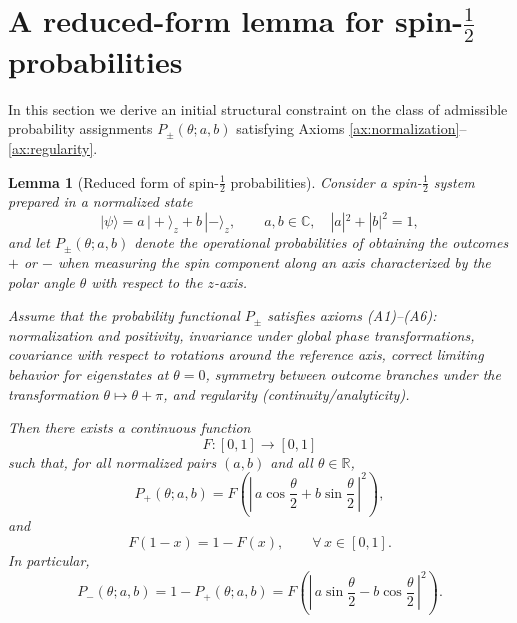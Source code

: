 \documentclass[11pt,a4paper]{article}
\numberwithin{equation}{section}
\newtheorem{lemma}[theorem]{Lemma}
\theoremstyle{definition}
\begin{document}
\section{A reduced-form lemma for spin-\texorpdfstring{$\tfrac12$}{1/2} probabilities}
\label{sec:reduced-form}

In this section we derive an initial structural constraint on the class of admissible probability assignments $P_\pm(\theta;a,b)$ satisfying Axioms
\ref{ax:normalization}--\ref{ax:regularity}.


\begin{lemma}[Reduced form of spin-$\tfrac12$ probabilities]
\label{lem:reduced-form}
Consider a spin-$\tfrac12$ system prepared in a normalized state
\[
|\psi\rangle = a\,|+\rangle_z + b\,|-\rangle_z, \qquad a,b \in \mathbb{C},\quad |a|^2 + |b|^2 = 1,
\]
and let $P_\pm(\theta;a,b)$ denote the operational probabilities of obtaining the outcomes
$+$ or $-$ when measuring the spin component along an axis characterized by the polar angle $\theta$ with respect to the $z$-axis.

Assume that the probability functional $P_\pm$ satisfies axioms (A1)--(A6): normalization and positivity, invariance under global phase transformations, covariance with respect to rotations around the reference axis, correct limiting behavior for eigenstates at $\theta=0$, symmetry between outcome branches under the transformation $\theta \mapsto \theta + \pi$, and regularity (continuity/analyticity).

Then there exists a continuous function
\[
F : [0,1] \to [0,1]
\]
such that, for all normalized pairs $(a,b)$ and all $\theta \in \mathbb{R}$,
\begin{equation}
\label{eq:reduced-form}
P_+(\theta;a,b)
=
F\!\left(
\left|\,a\cos\frac{\theta}{2} + b\sin\frac{\theta}{2}\,\right|^2
\right),
\end{equation}
and
\begin{equation}
\label{eq:F-symmetry}
F(1 - x) = 1 - F(x), \qquad \forall\,x \in [0,1].
\end{equation}
In particular,
\[
P_-(\theta;a,b) = 1 - P_+(\theta;a,b)
= F\!\left(
\left|\,a\sin\frac{\theta}{2} - b\cos\frac{\theta}{2}\,\right|^2
\right).
\]
\end{lemma}
\end{document}
